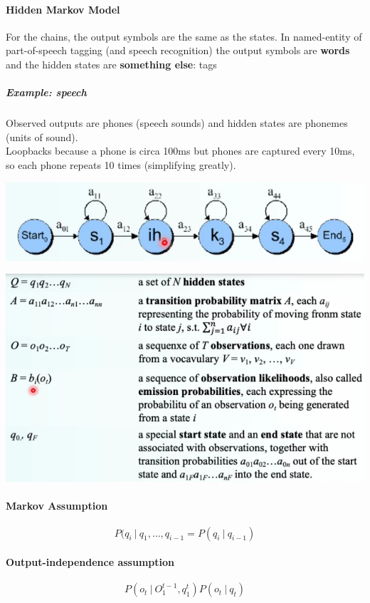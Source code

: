 \documentclass[10pt]{report}
\begin{document}
\paragraph{Hidden Markov Model} For the chains, the output symbols are the same as the states. In named-entity of part-of-speech tagging (and speech recognition) the output symbols are \textbf{words} and the hidden states are \textbf{something else}: tags\\ %
\subparagraph{Example: speech} Observed outputs are phones (speech sounds) and hidden states are phonemes (units of sound).\\
Loopbacks because a phone is circa 100ms but phones are captured every 10ms, so each phone repeats 10 times (simplifying greatly).
\begin{center}
	\includegraphics[scale=0.5]{14.png}
\end{center}
\begin{center}
	\includegraphics[scale=0.5]{13.png} %
\end{center}
\paragraph{Markov Assumption} $$P(q_i\:|\:q_1,\ldots,q_{i-1} = P(q_i\:|\:q_{i-1})$$
\paragraph{Output-independence assumption} $$P(o_t\:|\:O_1^{t-1},q_1^t)P(o_t\:|\:q_t)$$
\end{document}
